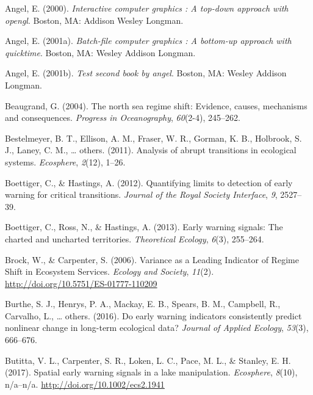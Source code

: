 \documentclass[12pt,twoside,openany]{reedthesis}
\begin{document}
\leavevmode\hypertarget{ref-angel2000}{}%
Angel, E. (2000). \emph{Interactive computer graphics : A top-down approach with opengl}. Boston, MA: Addison Wesley Longman.

\leavevmode\hypertarget{ref-angel2001}{}%
Angel, E. (2001a). \emph{Batch-file computer graphics : A bottom-up approach with quicktime}. Boston, MA: Wesley Addison Longman.

\leavevmode\hypertarget{ref-angel2002a}{}%
Angel, E. (2001b). \emph{Test second book by angel}. Boston, MA: Wesley Addison Longman.

\leavevmode\hypertarget{ref-beaugrand2004north}{}%
Beaugrand, G. (2004). The north sea regime shift: Evidence, causes, mechanisms and consequences. \emph{Progress in Oceanography}, \emph{60}(2-4), 245--262.

\leavevmode\hypertarget{ref-bestelmeyer_analysis_2011}{}%
Bestelmeyer, B. T., Ellison, A. M., Fraser, W. R., Gorman, K. B., Holbrook, S. J., Laney, C. M., \ldots{} others. (2011). Analysis of abrupt transitions in ecological systems. \emph{Ecosphere}, \emph{2}(12), 1--26.

\leavevmode\hypertarget{ref-boettiger_quantifying_2012}{}%
Boettiger, C., \& Hastings, A. (2012). Quantifying limits to detection of early warning for critical transitions. \emph{Journal of the Royal Society Interface}, \emph{9}, 2527--39.

\leavevmode\hypertarget{ref-boettiger_early_2013}{}%
Boettiger, C., Ross, N., \& Hastings, A. (2013). Early warning signals: The charted and uncharted territories. \emph{Theoretical Ecology}, \emph{6}(3), 255--264.

\leavevmode\hypertarget{ref-brock_variance_2006}{}%
Brock, W., \& Carpenter, S. (2006). Variance as a Leading Indicator of Regime Shift in Ecosystem Services. \emph{Ecology and Society}, \emph{11}(2). \url{http://doi.org/10.5751/ES-01777-110209}

\leavevmode\hypertarget{ref-burthe2016early}{}%
Burthe, S. J., Henrys, P. A., Mackay, E. B., Spears, B. M., Campbell, R., Carvalho, L., \ldots{} others. (2016). Do early warning indicators consistently predict nonlinear change in long-term ecological data? \emph{Journal of Applied Ecology}, \emph{53}(3), 666--676.

\leavevmode\hypertarget{ref-butitta_spatial_2017}{}%
Butitta, V. L., Carpenter, S. R., Loken, L. C., Pace, M. L., \& Stanley, E. H. (2017). Spatial early warning signals in a lake manipulation. \emph{Ecosphere}, \emph{8}(10), n/a--n/a. \url{http://doi.org/10.1002/ecs2.1941}
\end{document}

